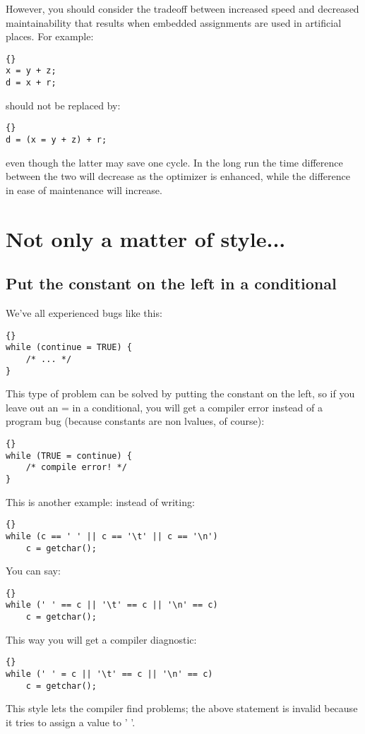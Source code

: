 \documentclass{report}
\begin{document}
However, you should consider the tradeoff between increased speed and decreased maintainability that results when embedded assignments are used in artificial places. For example:
\begin{lstlisting}{}
x = y + z;
d = x + r;
\end{lstlisting}
should not be replaced by: 
\begin{lstlisting}{}
d = (x = y + z) + r;
\end{lstlisting} 
even though the latter may save one cycle. In the long run the time difference between the two will decrease as the optimizer is enhanced, while the difference in ease of maintenance will increase. 



\chapter{Not only a matter of style...}



\section{Put the constant on the left in a conditional} 
We've all experienced bugs like this: 
\begin{lstlisting}{}
while (continue = TRUE) { 
    /* ... */
} 
\end{lstlisting}
This type of problem can be solved by putting the constant on the left, so if you leave out an = in a conditional, you will get a compiler error instead of a program bug (because constants are non lvalues, of course): 
\begin{lstlisting}{}
while (TRUE = continue) { 
    /* compile error! */
}
\end{lstlisting}
This is another example: instead of writing: 
\begin{lstlisting}{}
while (c == ' ' || c == '\t' || c == '\n')
    c = getchar();
\end{lstlisting}
You can say: 
\begin{lstlisting}{}
while (' ' == c || '\t' == c || '\n' == c)
    c = getchar();
\end{lstlisting}
This way you will get a compiler diagnostic: 
\begin{lstlisting}{}
while (' ' = c || '\t' == c || '\n' == c)
    c = getchar();
\end{lstlisting}
This style lets the compiler find problems; the above statement is invalid because it tries to assign a value to ' '.
\end{document}
